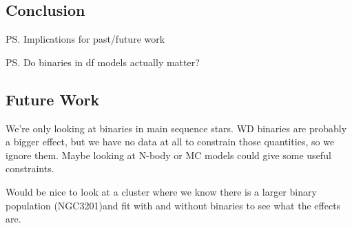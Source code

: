 \subsection{Conclusion}

\ps{Implications for past/future work}

\ps{Do binaries in df models actually matter?}








\subsection{Future Work}

We're only looking at binaries in main sequence stars. WD binaries are probably a bigger effect, but
we have no data at all to constrain those quantities, so we ignore them. Maybe looking at N-body or
MC models could give some useful constraints.

Would be nice to look at a cluster where we know there is a larger binary population (NGC3201)and
fit with and without binaries to see what the effects are.
